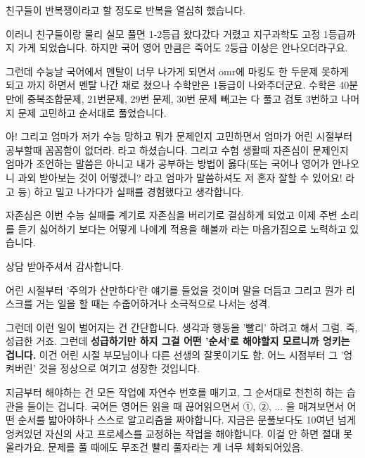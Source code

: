 친구들이 반복쟁이라고 할 정도로 반복을 열심히 했습니다.
\vspace{5mm}

이러니 친구들이랑 물리 실모 풀면 1-2등급 왔다갔다 거렸고 지구과학도 고정 1등급까지 가게 되었습니다.
하지만 국어 영어 만큼은 죽어도 2등급 이상은 안나오더라구요.
\vspace{5mm}

그런데 수능날 국어에서 멘탈이 너무 나가게 되면서 omr에 마킹도 한 두문제 못하게 되고 까지 하면서 멘탈 나간 채로 쳤으나 수학만은 1등급이 나와주더군요.
수학은 40분 만에 중복조합문제, 21번문제, 29번 문제, 30번 문제 빼고는 다 풀고 검토 3번하고 나머지 문제 고민하고 순서대로 풀었습니다.
\vspace{5mm}

아! 그리고 엄마가 저가 수능 망하고 뭐가 문제인지 고민하면서 엄마가 어린 시절부터 공부할때 꼼꼼함이 없더라. 라고 하셨습니다.
그리고 수험 생활때 자존심이 문제인지 엄마가 조언하는 말씀은 아니고 내가 공부하는 방법이 옳다(또는 국어나 영어가 안나오니 과외 받아보는 것이 어떻겠니? 라고 엄마가 말씀하셔도 저 혼자 잘할 수 있어요! 라고 등) 하고 밀고 나가다가 실패를 경험했다고 생각합니다.
\vspace{5mm}

자존심은 이번 수능 실패를 계기로 자존심을 버리기로 결심하게 되었고 이제 주변 소리를 듣기 싫어하기 보다는 어떻게 나에게 적용을 해볼까 라는 마음가짐으로 노력하고 있습니다.
\vspace{5mm}

상담 받아주셔서 감사합니다.
\vspace{5mm}

어린 시절부터 '주의가 산만하다'란 얘기를 들었을 것이며
말을 더듬고 그리고 뭔가 리스크를 거는 일을 할 때는 수줍어하거나 소극적으로 나서는 성격.
\vspace{5mm}

그런데 이런 일이 벌어지는 건 간단합니다.
생각과 행동을 '빨리' 하려고 해서 그럼. 즉, 성급한 거죠.
그런데 \textbf{성급하기만 하지 그걸 어떤 '순서'로 해야할지 모르니까 엉키는 겁니다.}
이건 어린 시절 부모님이나 다른 선생의 잘못이기도 함. 어느 시점부터 그 '엉켜버린' 것을 정상으로 여기고 성장한 것입니다.
\vspace{5mm}

지금부터 해야하는 건 모든 작업에 자연수 번호를 매기고, 그 순서대로 천천히 하는 습관을 들이는 겁니다.
국어든 영어든 읽을 때 끊어읽으면서 ①, ②, ... 을 매겨보면서 어떤 순서를 밟아야하나 스스로 알고리즘을 짜야합니다.
지금은 문풀보다도 10여년 넘게 엉켜있던 자신의 사고 프로세스를 교정하는 작업을 해야합니다. 이걸 안 하면 절대 못 올라가요.
문제를 풀 때에도 무조건 빨리 풀자라는 게 너무 체화되어있음.
\vspace{5mm}

